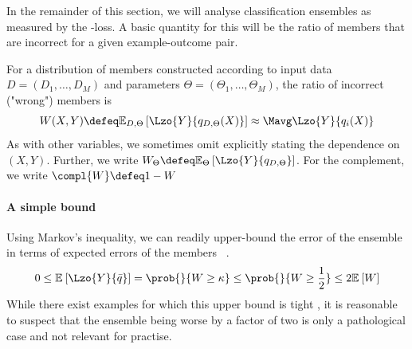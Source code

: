 \documentclass[../main.tex]{subfiles}
\begin{document}
In the remainder of this section, we will analyse classification ensembles as measured by the \zeroone-loss. 
A basic quantity for this will be the ratio of members that are incorrect for a given example-outcome pair.

\begin{definition}
For a distribution of members constructed according to input data $D = (D_{1}, \dots, D_{M})$ and parameters $\Theta = (\Theta_{1}, \dots, \Theta_{M})$, the ratio of incorrect ("wrong") members is
$$
W(X,Y) \defeq \mathbb{E}_{D, \Theta}\left[ \Lzo{Y}{q_{D, \Theta}(X)} \right] \approx \Mavg \Lzo{Y}{q_{i}(X)}
$$
As with other variables, we sometimes omit explicitly stating the dependence on $(X,Y)$. Further, we write $W_{\Theta} \defeq \mathbb{E}_{\Theta}\left[ \Lzo{Y}{q_{D, \Theta}} \right]$. For the complement, we write $\compl{W} \defeq 1 - W$
\end{definition}



\paragraph{A simple bound} Using Markov's inequality, we can readily upper-bound the error of the ensemble in terms of expected errors of the members~\cite{theisen_WhenAreEnsembles_2023}
.
$$
0 \leq \mathbb{E}_{}\left[ \Lzo{Y}{\bar{q}} \right] = \prob{}{W \geq \kappa} \leq \prob{}{W \geq \frac{1}{2}} \leq 2 \mathbb{E}_{}\left[ W \right] 
$$
While there exist examples for which this upper bound is tight \cite{theisen_WhenAreEnsembles_2023}, it is reasonable to suspect that the ensemble being worse by a factor of two is only a pathological case and not relevant for practise.

\end{document}
